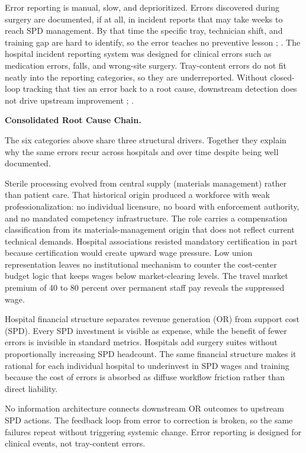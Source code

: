 \documentclass[10pt,a4paper]{article}
\begin{document}
Error reporting is manual, slow, and deprioritized. Errors discovered during
surgery are documented, if at all, in incident reports that may take weeks to
reach SPD management. By that time the specific tray, technician shift, and
training gap are hard to identify, so the error teaches no preventive lesson
\cite{nichol-et-al-2024};
\cite{zhu-et-al-2019}. The hospital incident reporting
system was designed for clinical errors such as medication errors, falls, and
wrong-site surgery. Tray-content errors do not fit neatly into the reporting
categories, so they are underreported. Without closed-loop tracking that ties an
error back to a root cause, downstream detection does not drive upstream
improvement \cite{nichol-et-al-2024};
\cite{zhu-et-al-2019}.

\textbf{Consolidated Root Cause Chain.}

The six categories above share three structural drivers. Together they explain
why the same errors recur across hospitals and over time despite being well
documented.

Sterile processing evolved from central supply (materials management) rather
than patient care. That historical origin produced a workforce with weak
professionalization: no individual licensure, no board with enforcement
authority, and no mandated competency infrastructure. The role carries a
compensation classification from its materials-management origin that does not
reflect current technical demands. Hospital associations resisted mandatory
certification in part because certification would create upward wage pressure.
Low union representation leaves no institutional mechanism to counter the
cost-center budget logic that keeps wages below market-clearing levels. The
travel market premium of 40 to 80 percent over permanent staff pay reveals the
suppressed wage.

Hospital financial structure separates revenue generation (OR) from support cost
(SPD). Every SPD investment is visible as expense, while the benefit of fewer
errors is invisible in standard metrics. Hospitals add surgery suites without
proportionally increasing SPD headcount. The same financial structure makes it
rational for each individual hospital to underinvest in SPD wages and training
because the cost of errors is absorbed as diffuse workflow friction rather than
direct liability.

No information architecture connects downstream OR outcomes to upstream SPD
actions. The feedback loop from error to correction is broken, so the same
failures repeat without triggering systemic change. Error reporting is designed
for clinical events, not tray-content errors.
\end{document}
